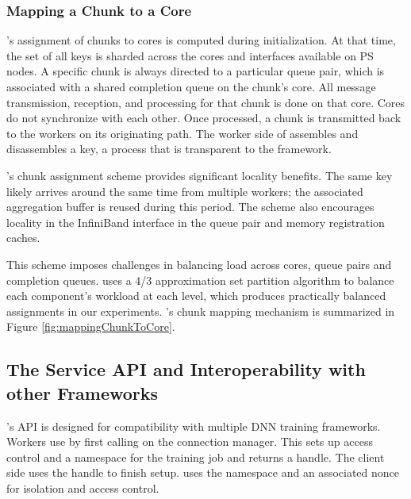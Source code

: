 \subsubsection{Mapping a Chunk to a Core}
\label{sec:chunk2core}
\phub's assignment of chunks to cores is computed during initialization. At that time, the set of all keys is sharded across the cores and interfaces available on PS nodes.
A specific chunk is always directed to a particular queue pair,
which is associated with a shared completion queue on the chunk's core.
All message transmission, reception, and processing for that chunk is done on that core. Cores do not synchronize with each other. Once processed, a chunk is transmitted back to the workers on its originating path. The worker side of \phub assembles and disassembles a key, a process that is transparent to the framework.

\phub{}'s chunk assignment scheme provides significant locality benefits. The same key likely arrives around the same time from multiple workers; the associated aggregation buffer is reused during this period. The scheme also encourages locality in the InfiniBand interface in the queue pair and memory registration caches. %

This scheme imposes challenges in balancing load across cores, queue pairs and completion queues. \phub uses a 4/3 approximation set partition algorithm to balance each component's workload at each level, which produces practically balanced assignments in our experiments. \phub{}'s chunk mapping mechanism is summarized in Figure \ref{fig:mappingChunkToCore}.

\subsection{The \phub Service API and Interoperability with other Frameworks}
\phub{}'s API is designed for compatibility with multiple DNN training frameworks. Workers use \phub by first calling  on the connection manager. This sets up access control and a namespace for the training job and returns a handle. The client side uses the handle to finish setup. \phub uses the namespace and an associated nonce for isolation and access control. 


